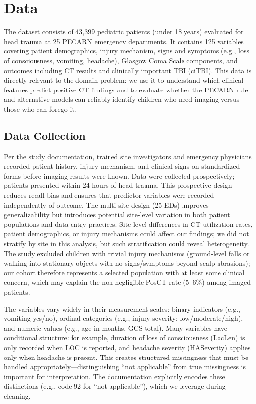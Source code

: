 \documentclass[10pt,letterpaper]{article}
\begin{document}
\section{Data}\label{data}

The dataset consists of 43,399 pediatric patients (under 18 years) evaluated for head trauma at 25 PECARN emergency departments. It contains 125 variables covering patient demographics, injury mechanism, signs and symptoms (e.g., loss of consciousness, vomiting, headache), Glasgow Coma Scale components, and outcomes including CT results and clinically important TBI (ciTBI). This data is directly relevant to the domain problem: we use it to understand which clinical features predict positive CT findings and to evaluate whether the PECARN rule and alternative models can reliably identify children who need imaging versus those who can forego it.

\subsection{Data Collection}\label{data-collection}

Per the study documentation, trained site investigators and emergency physicians recorded patient history, injury mechanism, and clinical signs on standardized forms before imaging results were known. Data were collected prospectively; patients presented within 24 hours of head trauma. This prospective design reduces recall bias and ensures that predictor variables were recorded independently of outcome. The multi-site design (25 EDs) improves generalizability but introduces potential site-level variation in both patient populations and data entry practices. Site-level differences in CT utilization rates, patient demographics, or injury mechanisms could affect our findings; we did not stratify by site in this analysis, but such stratification could reveal heterogeneity. The study excluded children with trivial injury mechanisms (ground-level falls or walking into stationary objects with no signs/symptoms beyond scalp abrasions); our cohort therefore represents a selected population with at least some clinical concern, which may explain the non-negligible PosCT rate (5--6\%) among imaged patients.

The variables vary widely in their measurement scales: binary indicators (e.g., vomiting yes/no), ordinal categories (e.g., injury severity: low/moderate/high), and numeric values (e.g., age in months, GCS total). Many variables have conditional structure: for example, duration of loss of consciousness (LocLen) is only recorded when LOC is reported, and headache severity (HASeverity) applies only when headache is present. This creates structured missingness that must be handled appropriately---distinguishing ``not applicable'' from true missingness is important for interpretation. The documentation explicitly encodes these distinctions (e.g., code 92 for ``not applicable''), which we leverage during cleaning.
\end{document}
